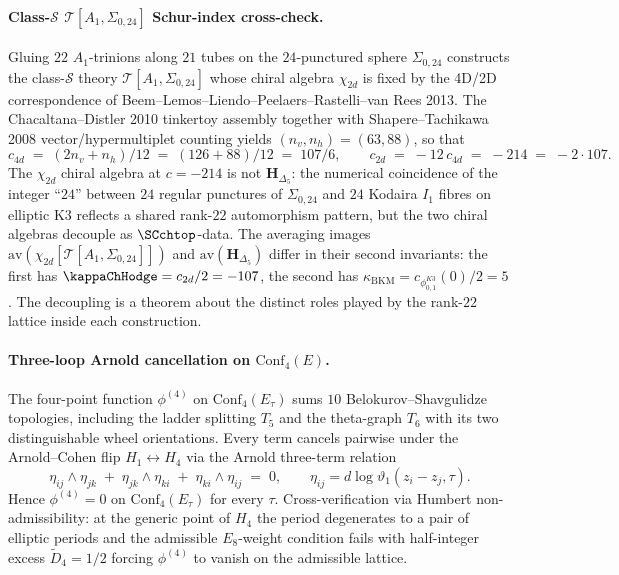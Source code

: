 \paragraph{Class-$\mathcal{S}$ $\mathcal{T}[A_1,\Sigma_{0,24}]$ Schur-index cross-check.}
Gluing $22$ $A_1$-trinions along $21$ tubes on the $24$-punctured
sphere $\Sigma_{0,24}$ constructs the class-$\mathcal{S}$ theory
$\mathcal{T}[A_1,\Sigma_{0,24}]$ whose chiral algebra $\chi_{2d}$ is
fixed by the 4D/2D correspondence of Beem--Lemos--Liendo--Peelaers--Rastelli--van Rees
2013. The Chacaltana--Distler 2010 tinkertoy assembly together with
Shapere--Tachikawa 2008 vector/hypermultiplet counting yields
$(n_v, n_h) = (63, 88)$, so that
\[
c_{4d}
\;=\;
(2n_v + n_h)/12
\;=\;
(126+88)/12
\;=\;
107/6,
\qquad
c_{2d}
\;=\;
-12\,c_{4d}
\;=\;
-214
\;=\;
-2\cdot 107.
\]
The $\chi_{2d}$ chiral algebra at $c = -214$ is not
$\mathbf{H}_{\Delta_5}$: the numerical coincidence of the integer
``$24$'' between $24$ regular punctures of $\Sigma_{0,24}$ and $24$
Kodaira $I_1$ fibres on elliptic K3 reflects a shared rank-$22$
automorphism pattern, but the two chiral algebras decouple as
$\SCchtop$-data. The averaging images
$\mathrm{av}(\chi_{2d}[\mathcal{T}[A_1,\Sigma_{0,24}]])$ and
$\mathrm{av}(\mathbf{H}_{\Delta_5})$ differ in their second invariants:
the first has $\kappaChHodge = c_{2d}/2 = -107$, the second has
$\kappa_{\mathrm{BKM}} = c_{\phi_{0,1}^{K3}}(0)/2 = 5$. The decoupling
is a theorem about the distinct roles played by the rank-$22$ lattice
inside each construction.

\paragraph{Three-loop Arnold cancellation on $\mathrm{Conf}_4(E)$.}
The four-point function $\phi^{(4)}$ on $\mathrm{Conf}_4(E_{\tau})$
sums $10$ Belokurov--Shavgulidze topologies, including the ladder
splitting $T_5$ and the theta-graph $T_6$ with its two distinguishable
wheel orientations. Every term cancels pairwise under the Arnold--Cohen
flip $H_1\leftrightarrow H_4$ via the Arnold three-term relation
\[
\eta_{ij}\wedge\eta_{jk}
\;+\;
\eta_{jk}\wedge\eta_{ki}
\;+\;
\eta_{ki}\wedge\eta_{ij}
\;=\;
0,
\qquad
\eta_{ij} = d\log\vartheta_1(z_i - z_j,\tau).
\]
Hence $\phi^{(4)} = 0$ on $\mathrm{Conf}_4(E_{\tau})$ for every
$\tau$. Cross-verification via Humbert non-admissibility: at the
generic point of $H_4$ the period degenerates to a pair of elliptic
periods and the admissible $E_8$-weight condition fails with
half-integer excess $\widetilde{D}_4 = 1/2$ forcing
$\phi^{(4)}$ to vanish on the admissible lattice.

